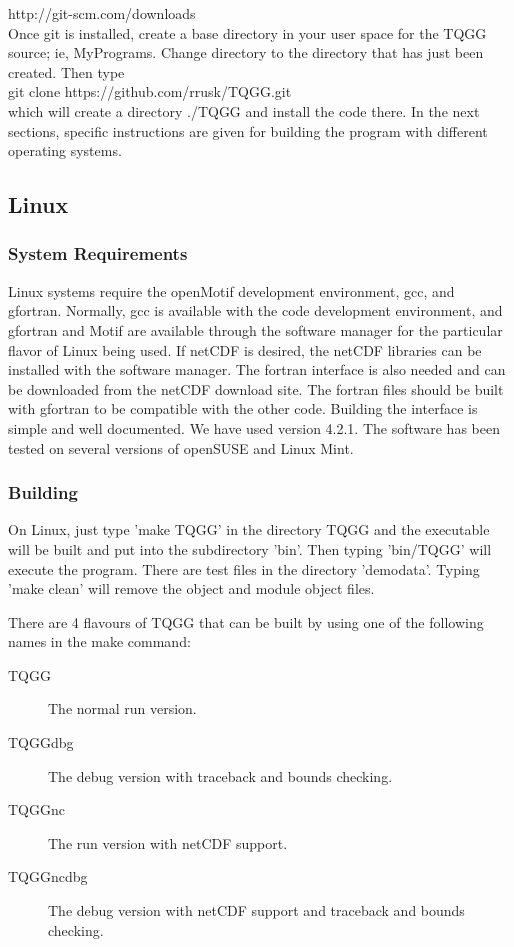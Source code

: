 \documentclass{article}
\begin{document}
\noindent http://git-scm.com/downloads \\

Once git is installed, create a base directory in your user space for the TQGG source; ie, MyPrograms.
Change directory to the directory that has just been created. Then type \\

\noindent git clone https://github.com/rrusk/TQGG.git \\

\noindent which will create a directory ./TQGG and install the code there. In the next sections, 
specific instructions are given for building the program with different operating systems.


\subsection{Linux}
\subsubsection{System Requirements}
Linux systems require the openMotif development environment, gcc, and gfortran. Normally, gcc is 
available with the code development environment, and gfortran and Motif are available through
the software manager for the particular flavor of Linux being used. If netCDF is desired, the netCDF 
libraries can be installed with the software manager. The fortran interface is also needed and can be 
downloaded from the netCDF download site. The fortran files should be built with gfortran to be compatible
with the other code. Building the interface is simple and well documented. We have used version 4.2.1.
The software has been
tested on several versions of openSUSE and Linux Mint. 

\subsubsection{Building}
On Linux, just type 'make TQGG' in the directory TQGG and the executable will be built and put into the
subdirectory 'bin'. Then typing 'bin/TQGG' will execute the program. There are test files in 
the directory 'demodata'. Typing 'make clean' will remove the object and module object files.

There are 4 flavours of TQGG that can be built by using one of the following names in the make command:
\begin{description}
 \item [TQGG] The normal run version.
 \item [TQGGdbg] The debug version with traceback and bounds checking.
 \item [TQGGnc] The run version with netCDF support.
 \item [TQGGncdbg] The debug version with netCDF support and traceback and bounds checking.
\end{description}
\end{document}
